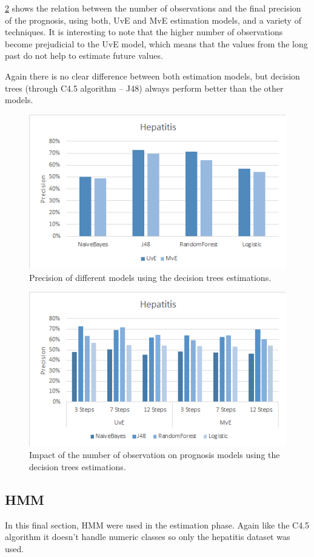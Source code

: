 \ref{fig:impactobservationstree} shows the relation between the number of observations and the final precision of the prognosis, using both, UvE and MvE
 estimation models, and a variety of techniques. It is interesting to note that the higher number of observations become prejudicial
 to the UvE model, which means that the values from the long past do not help to estimate future values. 

Again there is no clear difference between both estimation models, but decision trees (through C4.5 algorithm – J48) always 
perform better than the other models. 

\begin{figure}
	\centering
  \includegraphics[width=0.49\linewidth]{Figures/precision_h_tree.png}
  \caption{Precision of different models using the decision trees estimations.}
  \label{fig:precisiontree}
\end{figure}

 \begin{figure}
	\centering
	\includegraphics[width=0.49\linewidth]{Figures/impact_h_tree.png}
  \caption{Impact of the number of observation on prognosis models using the decision trees estimations.}
  \label{fig:impactobservationstree}
\end{figure}





\subsection{HMM}
\label{subsection:hmm}

In this final section, HMM were used in the estimation phase. Again like the C4.5 algorithm it doesn't handle
numeric classes so only the hepatitis dataset was used.

